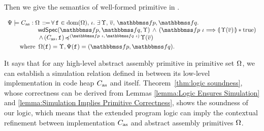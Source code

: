 Then we give the semantics of well-formed primitive in 
\Def{\ref{def:wdprim-sem}}. 
\begin{definition}
    \em
    \label{def:wdprim-sem}
    \small
    \[
        \begin{array}{l}
            \semWdPrim{\Cspec}{\asmimp}{\hprimset} 
            \, \define \, 
            \forall \, \lab{} \in \dom(\hprimset), \, 
            \lgvl. \ 
            \exists \, \hprim, \, \args{\val}, \,
            \relspecpre, \relspecpost.  \\
            \hspace*{5em}
            \wdSpec{\relspecpre}{\relspecpost} {\hprim} 
            	\, \land \, 
            	(\relspecpre \ \lgvl \Longrightarrow  
            	\safePrimAst{\, \hprim(\args{\val}) \,} 
                \sepstar \atrue) \\
            \hspace*{5em}
            \, \land \, 
            \simFunction{(\asmimp, \lab{})}
                {(\relspecpre \ \lgvl, \,
                    \relspecpost \ \lgvl)}
                {\hprim(\args{\val})}
            \\
            \\[-9pt]
            \hspace*{2em}
            \TYPE{where } \, 
            \hprimset(\lab{}) = \hprim, 
            \Cspec(\lab{}) = (\relspecpre, \relspecpost).
        \end{array}
    \]
\end{definition}
It says that for any high-level 
abstract assembly primitive
in primitive set $\Omega$, 
we can establish a simulation relation 
defined in \Def{\ref{def:simfunc}} 
between its low-level implementation 
in code heap $C_{\text{as}}$ and itself. 
Theorem~\ref{thm:logic soundness}, 
whose correctness can be derived from Lemmas 
\ref{lemma:Logic Ensures Simulation} 
and \ref{lemma:Simulation Implies Primitive Correctness}, 
shows the soundness of our logic, 
which means that the extended program logic can 
imply the contextual refinement between implementation 
$C_{\text{as}}$ and abstract assembly primitives $\Omega$.

